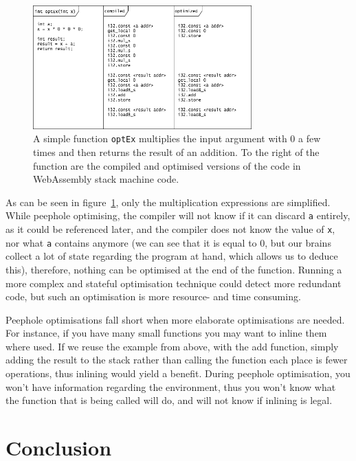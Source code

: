 \documentclass[a4paper]{article}
\begin{document}
\begin{figure}[H]
	\includegraphics[width=0.75\textwidth]{PeepholeOptimisation}
	\centering
	\caption{A simple function \texttt{optEx} multiplies the input argument with $0$ a few times and then returns the result of an addition. To the right of the function are the compiled and optimised versions of the code in WebAssembly stack machine code.}
\label{fig:peephole-optimisation}
\end{figure}
As can be seen in figure~\ref{fig:peephole-optimisation}, only the multiplication expressions are simplified. While peephole optimising, the compiler will not know if it can discard \texttt{a} entirely, as it could be referenced later, and the compiler does not know the value of \texttt{x}, nor what \texttt{a} contains anymore (we can see that it is equal to $0$, but our brains collect a lot of state regarding the program at hand, which allows us to deduce this), therefore, nothing can be optimised at the end of the function. Running a more complex and stateful optimisation technique could detect more redundant code, but such an optimisation is more resource- and time consuming.

Peephole optimisations fall short when more elaborate optimisations are needed. For instance, if you have many small functions you may want to inline them where used. If we reuse the example from above, with the add function, simply adding the result to the stack rather than calling the function each place is fewer operations, thus inlining would yield a benefit. During peephole optimisation, you won't have information regarding the environment, thus you won’t know what the function that is being called will do, and will not know if inlining is legal.

\section{Conclusion}
\label{sec:conclusion}
\end{document}
